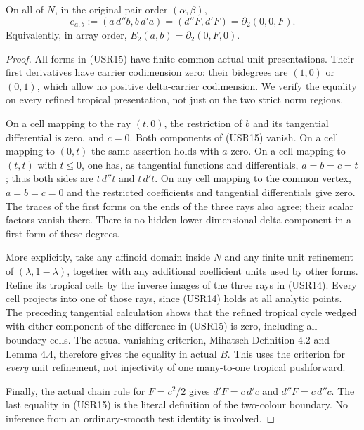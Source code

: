 \begin{theorem}
On all of $N$, in the original pair order $(\alpha,\beta)$,
\[
       e_{a,b}:=(a\,d''b,b\,d'a)=(d''F,d'F)
                        =\partial_2(0,0,F).
 \tag{USR15}
\]
Equivalently, in array order,
$E_2(a,b)=\partial_2(0,F,0)$.
\end{theorem}

\begin{proof}
All forms in (USR15) have finite common actual unit presentations.
Their first derivatives have carrier codimension zero: their
bidegrees are $(1,0)$ or $(0,1)$, which allow no positive
delta-carrier codimension.  We verify the equality on every refined
tropical presentation, not just on the two strict norm regions.

On a cell mapping to the ray $(t,0)$, the restriction of $b$ and
its tangential differential is zero, and $c=0$.  Both components
of (USR15) vanish.  On a cell mapping to $(0,t)$ the same assertion
holds with $a$ zero.  On a cell mapping to $(t,t)$ with $t\le0$,
one has, as tangential functions and differentials,
$a=b=c=t$; thus both sides are $t\,d''t$ and $t\,d't$.
On any cell mapping to the common vertex, $a=b=c=0$ and the
restricted coefficients and tangential differentials give zero.
The traces of the first forms on the ends of the three rays also
agree; their scalar factors vanish there.  There is no hidden
lower-dimensional delta component in a first form of these degrees.

More explicitly, take any affinoid domain inside $N$ and any finite
unit refinement of $(\lambda,1-\lambda)$, together with any
additional coefficient units used by other forms.  Refine its
tropical cells by the inverse images of the three rays in (USR14).
Every cell projects into one of those rays, since (USR14) holds at
all analytic points.  The preceding tangential calculation shows
that the refined tropical cycle wedged with either component of
the difference in (USR15) is zero, including all boundary cells.
The actual vanishing criterion, Mihatsch Definition 4.2 and
Lemma 4.4, therefore gives the equality in actual $B$.
This uses the criterion for \emph{every} unit refinement, not
injectivity of one many-to-one tropical pushforward.

Finally, the actual chain rule for $F=c^2/2$ gives $d'F=c\,d'c$
and $d''F=c\,d''c$.  The last equality in (USR15) is the literal
definition of the two-colour boundary.  No inference from an
ordinary-smooth test identity is involved.
\end{proof}

